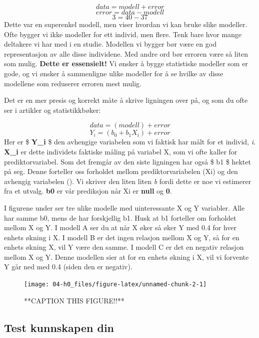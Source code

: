 \documentclass[
]{book}
\begin{document}
\[
data = modell + error
\]
\[
error = data - modell
\]
\[
3 = 40 - 37
\]
Dette var en superenkel modell, men viser hvordan vi kan bruke slike modeller. Ofte bygger vi ikke modeller for ett individ, men flere. Tenk bare hvor mange deltakere vi har med i en studie. Modellen vi bygger bør være en god representasjon av alle disse individene. Med andre ord bør erroren være så liten som mulig. \textbf{Dette er essensielt!} Vi ønsker å bygge statistiske modeller som er gode, og vi ønsker å sammenligne ulike modeller for å se hvilke av disse modellene som reduserer erroren mest mulig.

Det er en mer presis og korrekt måte å skrive ligningen over på, og som du ofte ser i artikler og statistikkbøker:

\[
data = (modell) + error
\]
\[
Y_i = (b_0 + b_1X_i) + error
\]
Her er \$ \textbf{Y\_i} \$ den avhengige variabelen som vi faktisk har målt for et individ, \emph{i}. \textbf{X\_i} er dette individets faktiske måling på variabel X, som vi ofte kaller for prediktorvariabel. Som det fremgår av den siste ligningen har også \$ b1 \$ hektet på seg. Denne forteller oss forholdet mellom prediktorvariabelen (Xi) og den avhengig variabelen (). Vi skriver den liten liten \emph{b} fordi dette er noe vi estimerer fra et utvalg. \textbf{b0} er vår prediksjon når Xi er \textbf{null} og \textbf{0}.

I figurene under ser tre ulike modelle med uinteressante X og Y variabler. Alle har samme b0, mens de har forskjellig b1. Husk at b1 forteller om forholdet mellom X og Y. I modell A ser du at når X øker så øker Y med 0.4 for hver enhets økning i X. I modell B er det ingen relasjon mellom X og Y, så for en enhets økning X, vil Y være den samme. I modell C er det en negativ relasjon mellom X og Y. Denne modellen sier at for en enhets økning i X, vil vi forvente Y går ned med 0.4 (siden den er negativ).

\begin{figure}

{\centering \texttt{[image: 04-h0\_files/figure-latex/unnamed-chunk-2-1]} 

}

\caption{**CAPTION THIS FIGURE!!**}\label{fig:unnamed-chunk-2}
\end{figure}

\hypertarget{test-kunnskapen-din}{%
\subsection{Test kunnskapen din}\label{test-kunnskapen-din}}
\end{document}
